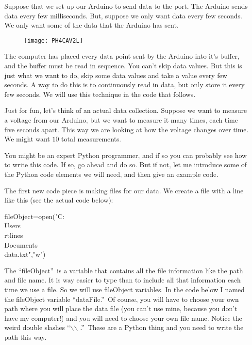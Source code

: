 Suppose that we set up our Arduino to send data to the port. The Arduino
sends data every few milliseconds. But, suppose we only want data every few
seconds. We only want some of the data that the Arduino has sent. \begin{figure}[h!]
\texttt{[image: PH4CAV2L]}
\end{figure}%
The computer has placed every data point sent by the Arduino into it's
buffer, and the buffer must be read in sequence. You can't skip data values.
But this is just what we want to do, skip some data values and take a value
every few seconds. A way to do this is to continuously read in data, but
only store it every few seconds. We will use this technique in the code that
follows.

Just for fun, let's think of an actual data collection. Suppose we want to
measure a voltage from our Arduino, but we want to measure it many times,
each time five seconds apart. This way we are looking at how the voltage
changes over time. We might want $10$ total measurements.

You might be an expert Python programmer, and if so you can probably see how
to write this code. If so, go ahead and do so. But if not, let me introduce
some of the Python code elements we will need, and then give an example code.

The first new code piece is making files for our data. We create a file with
a line like this (see the actual code below):%

\begin{python}
	fileObject=open("C:\\Users\\rtlines\\Documents\\data.txt","w")	
\end{python}

The \textquotedblleft fileObject\textquotedblright\ is a variable that contains all the file information like the path and file name. It is way easier to type than to include all that information each time we use a file. So we will use fileObject variables. In the code below I named the fileObject variable \textquotedblleft dataFile.\textquotedblright\ Of course, you will have to choose your own path where you will place the data file (you can't use mine, because you don't have my computer!) and you will need to choose your own file name. Notice the weird double slashes
\textquotedblleft $\backslash$$\backslash$%
.\textquotedblright\ These are a Python thing and you need to write the path this way.

